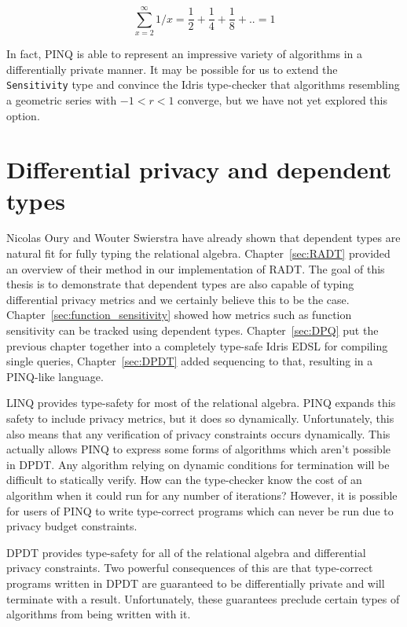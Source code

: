 \documentclass[12pt]{report}
\begin{document}
$$\sum_{x=2}^{\infty} 1/x = \frac{1}{2} + \frac{1}{4} + \frac{1}{8} + .. = 1$$

In fact, PINQ is able to represent an impressive variety of algorithms in a differentially private manner.
It may be possible for us to extend the \texttt{Sensitivity} type and convince the Idris type-checker that algorithms resembling a geometric series with $-1 < r < 1$ converge, but we have not yet explored this option.

\section{Differential privacy and dependent types}

Nicolas Oury and Wouter Swierstra have already shown that dependent types are natural fit for fully typing the relational algebra\cite{OurySwierstra08PowerOfPi}.
Chapter~\ref{sec:RADT} provided an overview of their method in our implementation of RADT.
The goal of this thesis is to demonstrate that dependent types are also capable of typing differential privacy metrics and we certainly believe this to be the case.
Chapter~\ref{sec:function_sensitivity} showed how metrics such as function sensitivity can be tracked using dependent types.
Chapter~\ref{sec:DPQ} put the previous chapter together into a completely type-safe Idris EDSL for compiling single queries, Chapter~\ref{sec:DPDT} added sequencing to that, resulting in a PINQ-like language.

LINQ provides type-safety for most of the relational algebra.
PINQ expands this safety to include privacy metrics, but it does so dynamically.
Unfortunately, this also means that any verification of privacy constraints occurs dynamically.
This actually allows PINQ to express some forms of algorithms which aren't possible in DPDT.
Any algorithm relying on dynamic conditions for termination will be difficult to statically verify.
How can the type-checker know the cost of an algorithm when it could run for any number of iterations?
However, it is possible for users of PINQ to write type-correct programs which can never be run due to privacy budget constraints.

DPDT provides type-safety for all of the relational algebra and differential privacy constraints.
Two powerful consequences of this are that type-correct programs written in DPDT are guaranteed to be differentially private and will terminate with a result.
Unfortunately, these guarantees preclude certain types of algorithms from being written with it.
\end{document}
